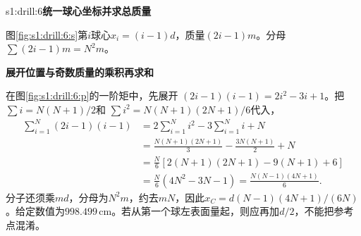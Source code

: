 \begin{drillsolution}{s1:drill:6}\textbf{统一球心坐标并求总质量}\par\nobreak
图\ref{fig:s1:drill:6:s}第$i$球心$x_i=(i-1)d$，质量$(2i-1)m$。分母$\sum(2i-1)m=N^2m$。



\par\medskip{}\noindent\textbf{展开位置与奇数质量的乘积再求和}\par\nobreak
在图\ref{fig:s1:drill:6:p}的一阶矩中，先展开 $(2i-1)(i-1)=2i^2-3i+1$。把 $\sum i=N(N+1)/2$和 $\sum i^2=N(N+1)(2N+1)/6$代入，
\begin{align*}
 \sum_{i=1}^N(2i-1)(i-1)
 &=2\sum_{i=1}^Ni^2-3\sum_{i=1}^Ni+N\\
 &=\frac{N(N+1)(2N+1)}3-\frac{3N(N+1)}2+N\\
 &=\frac N6[2(N+1)(2N+1)-9(N+1)+6]\\
 &=\frac N6(4N^2-3N-1)
 =\frac{N(N-1)(4N+1)}6.
\end{align*}
分子还须乘$md$，分母为$N^2m$，约去$mN$，因此$x_C=d(N-1)(4N+1)/(6N)$。给定数值为$998.499\,\mathrm{cm}$。若从第一个球左表面量起，则应再加$d/2$，不能把参考点混淆。\end{drillsolution}
